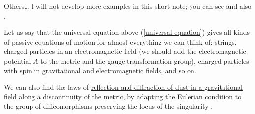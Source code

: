\begin{Article}{Others\dots}{}
  I will not develop more examples in this short note;
  you can see \cite{Sou74} and also \cite{Ste12}.
  
  Let us say that the universal equation above (\ref{universal-equation}) gives all kinds of passive equations of motion
  for almost everything we can think of:
  strings,
  charged particles in an electromagnetic field (we should add the electromagnetic potential $A$ to the metric and the gauge transformation group),
  charged particles with spin in gravitational and electromagnetic fields, and so on.
  
  We can also find the laws of \uline{reflection and diffraction of dust in a gravitational field}
  along a discontinuity of the metric,
  by adapting the Eulerian condition to the group of diffeomorphisms preserving the locus of the singularity \cite{PIZ19}.
\end{Article}

